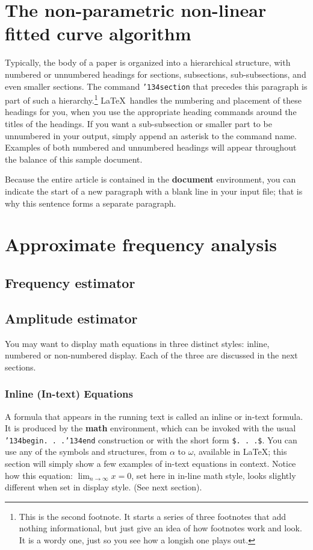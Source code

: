 \documentclass{sig-alternate}
\begin{document}
\section{The non-parametric non-linear fitted curve algorithm}
Typically, the body of a paper is organized
into a hierarchical structure, with numbered or unnumbered
headings for sections, subsections, sub-subsections, and even
smaller sections.  The command \texttt{{\char'134}section} that
precedes this paragraph is part of such a
hierarchy.\footnote{This is the second footnote.  It
starts a series of three footnotes that add nothing
informational, but just give an idea of how footnotes work
and look. It is a wordy one, just so you see
how a longish one plays out.} \LaTeX\ handles the numbering
and placement of these headings for you, when you use
the appropriate heading commands around the titles
of the headings.  If you want a sub-subsection or
smaller part to be unnumbered in your output, simply append an
asterisk to the command name.  Examples of both
numbered and unnumbered headings will appear throughout the
balance of this sample document.

Because the entire article is contained in
the \textbf{document} environment, you can indicate the
start of a new paragraph with a blank line in your
input file; that is why this sentence forms a separate paragraph.

\section{Approximate frequency analysis}


\subsection{Frequency estimator}
\subsection{Amplitude estimator}

You may want to display math equations in three distinct styles:
inline, numbered or non-numbered display.  Each of
the three are discussed in the next sections.

\subsubsection{Inline (In-text) Equations}
A formula that appears in the running text is called an
inline or in-text formula.  It is produced by the
\textbf{math} environment, which can be
invoked with the usual \texttt{{\char'134}begin. . .{\char'134}end}
construction or with the short form \texttt{\$. . .\$}. You
can use any of the symbols and structures,
from $\alpha$ to $\omega$, available in
\LaTeX\cite{Lamport:LaTeX}; this section will simply show a
few examples of in-text equations in context. Notice how
this equation: \begin{math}\lim_{n\rightarrow \infty}x=0\end{math},
set here in in-line math style, looks slightly different when
set in display style.  (See next section).
\end{document}
